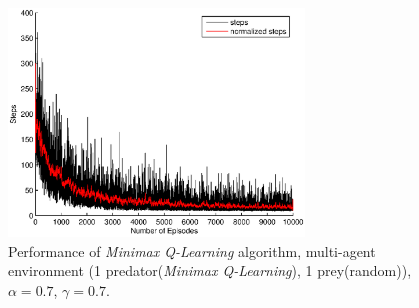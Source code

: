 \documentclass[a4paper,11pt]{article}
\begin{document}
\begin{figure}[h]
\begin{center}
	\includegraphics[width=0.7\textwidth]{figures/minimax0707.eps}
   \caption{Performance of  \textit{Minimax Q-Learning} algorithm, multi-agent environment (1 predator(\textit{Minimax Q-Learning}), 1 prey(random)), $\alpha = 0.7$, $\gamma = 0.7$.}
    \label{m22}
\end{center}
\end{figure}
\end{document}
